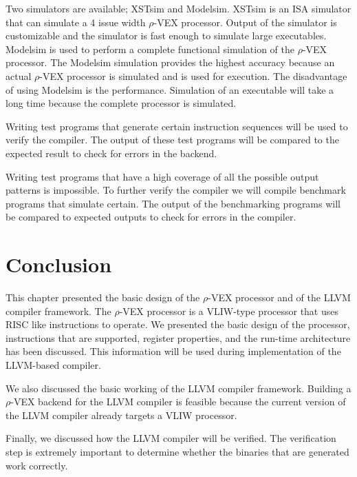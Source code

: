Two simulators are available; XSTsim and Modelsim. XSTsim is an ISA simulator that can simulate a 4 issue width $\rho$-VEX processor. Output of the simulator is customizable and the simulator is fast enough to simulate large executables. Modelsim is used to perform a complete functional simulation of the $\rho$-VEX processor. The Modelsim simulation provides the highest accuracy because an actual $\rho$-VEX processor is simulated and is used for execution. The disadvantage of using Modelsim is the performance. Simulation of an executable will take a long time because the complete processor is simulated.

Writing test programs that generate certain instruction sequences will be used to verify the compiler. The output of these test programs will be compared to the expected result to check for errors in the backend.

Writing test programs that have a high coverage of all the possible output patterns is impossible. To further verify the compiler we will compile benchmark programs that simulate certain. The output of the benchmarking programs will be compared to expected outputs to check for errors in the compiler.

\section{Conclusion}
This chapter presented the basic design of the $\rho$-VEX processor and of the LLVM compiler framework. The $\rho$-VEX processor is a VLIW-type processor that uses RISC like instructions to operate. We presented the basic design of the processor, instructions that are supported, register properties, and the run-time architecture has been discussed. This information will be used during implementation of the LLVM-based compiler.

We also discussed the basic working of the LLVM compiler framework. Building a $\rho$-VEX backend for the LLVM compiler is feasible because the current version of the LLVM compiler already targets a VLIW processor. 

Finally, we discussed how the LLVM compiler will be verified. The verification step is extremely important to determine whether the binaries that are generated work correctly.

\acresetall

